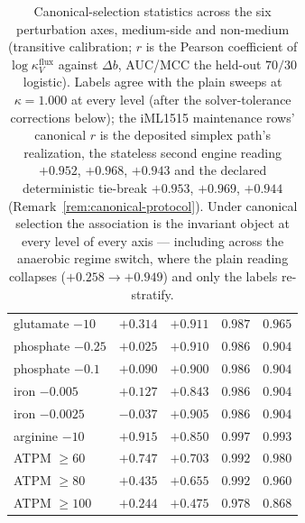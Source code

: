 \documentclass[11pt,a4paper]{article}
\theoremstyle{plain}
\theoremstyle{definition}
\theoremstyle{remark}
\begin{document}
\begin{table}[t]
\begin{tabular}{lcccc}
glutamate $-10$ & $+0.314$ & $+0.911$ & $0.987$ & $0.965$ \\
phosphate $-0.25$ & $+0.025$ & $+0.910$ & $0.986$ & $0.904$ \\
phosphate $-0.1$ & $+0.090$ & $+0.900$ & $0.986$ & $0.904$ \\
iron $-0.005$ & $+0.127$ & $+0.843$ & $0.986$ & $0.904$ \\
iron $-0.0025$ & $-0.037$ & $+0.905$ & $0.986$ & $0.904$ \\
arginine $-10$ & $+0.915$ & $+0.850$ & $0.997$ & $0.993$ \\
ATPM $\ge 60$ & $+0.747$ & $+0.703$ & $0.992$ & $0.980$ \\
ATPM $\ge 80$ & $+0.435$ & $+0.655$ & $0.992$ & $0.960$ \\
ATPM $\ge 100$ & $+0.244$ & $+0.475$ & $0.978$ & $0.868$ \\
\hline
\end{tabular}
\caption{Canonical-selection statistics across the six
perturbation axes, medium-side and non-medium (transitive
calibration; $r$ is the Pearson
coefficient of $\log\kappa^{\mathrm{flux}}_V$ against $\Delta b$,
AUC/MCC the held-out $70/30$ logistic). Labels agree with the plain
sweeps at $\kappa=1.000$ at every level (after the
solver-tolerance corrections below); the iML1515 maintenance rows'
canonical $r$ is the deposited simplex path's realization, the
stateless second engine reading $+0.952$, $+0.968$, $+0.943$ and
the declared deterministic tie-break $+0.953$, $+0.969$, $+0.944$
(Remark~\ref{rem:canonical-protocol}). Under canonical selection the
association is the invariant object at every level of every axis ---
including across the anaerobic regime switch, where the plain
reading collapses ($+0.258 \to +0.949$) and only the labels
re-stratify.}
\label{tab:canonical-selection}
\end{table}
\end{document}
